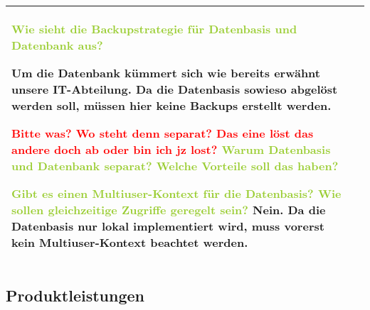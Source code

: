 \begin{center}
\begin{tabular}[ht] {l | p{13cm}}
        \textcolor{YellowGreen}{Wie sieht die Backupstrategie für Datenbasis und Datenbank aus?}

        \textcolor{NavyBlue}{Um die Datenbank kümmert sich wie bereits erwähnt unsere IT-Abteilung. Da die Datenbasis sowieso abgelöst werden soll, müssen hier keine Backups erstellt werden.}

        \textcolor{Red}{Bitte was? Wo steht denn separat? Das eine löst das andere doch ab oder bin ich jz lost?}
        \textcolor{YellowGreen}{Warum \grqq{}Datenbasis\grqq{} und Datenbank separat? Welche Vorteile soll das haben?}

        \textcolor{YellowGreen}{Gibt es einen Multiuser-Kontext für die \grqq{}Datenbasis\grqq{}? Wie sollen gleichzeitige Zugriffe geregelt sein?}
        \textcolor{NavyBlue}{Nein. Da die Datenbasis nur lokal implementiert wird, muss vorerst kein Multiuser-Kontext beachtet werden.}
        \\
        \hline
        
    \end{tabular}
\end{center}

\subsection{Produktleistungen}

